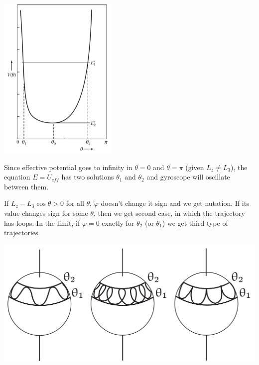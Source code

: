 \begin{center}
	\includegraphics[width=0.3\linewidth]{./lect24/3.jpg}
\end{center}
Since effective potential goes to infinity in $\theta=0$ and $\theta=\pi$ (given $L_z\neq L_3$), the equation $E=U_{eff}$ has two solutions $\theta_1$ and $\theta_2$ and gyroscope will oscillate between them. 

If $L_z-L_3\cos \theta > 0$ for all $\theta$, $\dot{\varphi} $ doesn't change it sign and we get nutation. If its value changes sign for some $\theta$, then we get second case, in which the trajectory has loops. In the limit, if $\dot{\varphi} = 0$ exactly for $\theta_2$ (or $\theta_1$) we get third type of trajectories.

\begin{center}
	\includegraphics[width=\linewidth]{./lect24/2.png}
\end{center}
